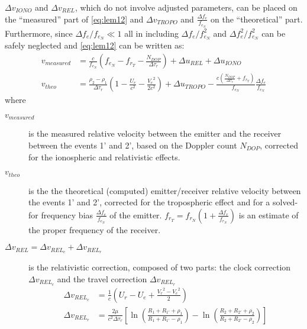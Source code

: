$\Delta v_{IONO}$ and $\Delta v_{REL}$, which do not involve adjusted parameters, can be placed 
on the ``measured'' part of \autoref{eq:lem12} and $\Delta v_{TROPO}$ and $\frac{\Delta f_e}{f_{e_N}}$ 
on the ``theoretical'' part. Furthermore, since $\Delta f_e / f_{e_N} \ll 1$ all in 
including $\Delta f_e / f^2_{e_N}$ and $\Delta f^2_e / f^2_{e_N}$ can be safely neglected and 
\autoref{eq:lem12} can be written as:
\begin{subequations}\label{eq:lem13}
    \begin{align}
        v_{measured} & = \frac{c}{f_{e_N}} (f_{e_N} - f_{r_T} -
          \frac{N_{DOP}}{\Delta\tau_r}) + \Delta u_{REL} + 
          \Delta u_{IONO} \label{eq:lem13a} \\
        v_{theo} &= \frac{\rho_2 - \rho_1}{\Delta\tau_r} 
          (1- \frac{U_e}{c^2} - \frac{{V_e}^2}{2 c^2}) + 
          \Delta u_{TROPO} - \frac{c(\frac{N_{DOP}}{\Delta\tau_r} + 
          f_{r_T})}{f_{e_N}} \frac{\Delta f_e}{f_{e_N}} \label{eq:lem13b}
    \end{align}
\end{subequations}
where 
\begin{description}
    \item[\(v_{measured}\)] is the measured relative velocity between the emitter and 
    the receiver between the events 1' and 2', based on the Doppler count \(N_{DOP}\), 
    corrected for the ionospheric and relativistic effects.

    \item[\(v_{theo}\)] is the the theoretical (computed) emitter/receiver relative velocity 
    between the events 1' and 2', corrected for the tropospheric effect and for a solved-for 
    frequency bias \(\frac{\Delta f_e}{f_{e_N}}\) of the emitter. 
    \(f_{r_T} = f_{r_N} (1 + \frac{\Delta f_r}{f_{r_N}})\) 
    is an estimate of the proper frequency of the receiver.

    \item[\(\Delta v_{REL} = \Delta v_{{REL}_c} + \Delta v_{{REL}_r}\)] is the relativistic 
    correction, composed of two parts: the clock correction \(\Delta v_{{REL}_c}\) and the 
    travel correction \(\Delta v_{{REL}_r}\)
    \begin{subequations}\label{eq:lem14}
        \begin{align}
            \Delta v_{{REL}_c} & = \frac{1}{c} 
              (U_r - U_e + \frac{{V_r}^2 - {V_e}^2}{2}) \label{eq:lem14a}\\
            \Delta v_{{REL}_r} & = \frac{2 \mu}{c^2 \Delta\tau_r} \left[ 
              \ln{(\frac{R_1 + R_{1'} + \rho_1}{R_1 + R_{1'} - \rho_1})} - 
              \ln{(\frac{R_2 + R_{2'} + \rho_2}{R_2 + R_{2'} - \rho_2})} \right] \label{eq:lem14b}
        \end{align}
    \end{subequations}
\end{description}

